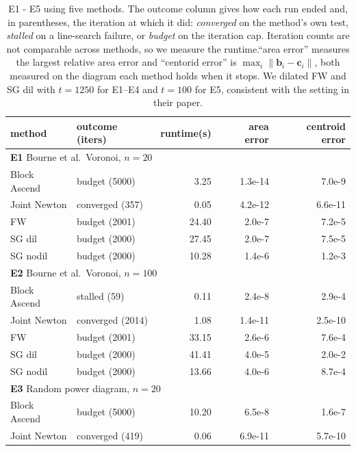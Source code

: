 \begin{table}[h]
\centering \small
\setlength{\tabcolsep}{3pt}
\caption{E1 - E5 using five methods.
The outcome column gives how each run
  ended and, in parentheses, the iteration at which it did: \emph{converged}
  on the method's own test, \emph{stalled} on a line-search failure, or
  \emph{budget} on the iteration cap. Iteration counts are not comparable
  across methods, so we measure the runtime.``area error'' measures the largest relative area error and
  ``centorid error'' is $\max_i\|\mathbf{b}_i-\mathbf{c}_i\|$, both measured on the
  diagram each method holds when it stops. We dilated FW and SG dil with $t=1250$ for E1--E4
  and $t=100$ for E5, consistent with the setting in their paper.}
\label{tab:results}
\begin{tabular}{llrrr}
\toprule
method & outcome (iters) & runtime(s) & area error & centroid error \\
\midrule
\multicolumn{5}{l}{\textbf{E1}\; Bourne et al.\ Voronoi, $n=20$}\\[1pt]
Block Ascend & budget {\scriptsize (5000)} & 3.25 & 1.3e-14 & 7.0e-9 \\
Joint Newton & converged {\scriptsize (357)} & 0.05 & 4.2e-12 & 6.6e-11 \\
FW & budget {\scriptsize (2001)} & 24.40 & 2.0e-7 & 7.2e-5 \\
SG dil & budget {\scriptsize (2000)} & 27.45 & 2.0e-7 & 7.5e-5 \\
SG nodil & budget {\scriptsize (2000)} & 10.28 & 1.4e-6 & 1.2e-3 \\
\midrule
\multicolumn{5}{l}{\textbf{E2}\; Bourne et al.\ Voronoi, $n=100$}\\[1pt]
Block Ascend & stalled {\scriptsize (59)} & 0.11 & 2.4e-8 & 2.9e-4 \\
Joint Newton & converged {\scriptsize (2014)} & 1.08 & 1.4e-11 & 2.5e-10 \\
FW & budget {\scriptsize (2001)} & 33.15 & 2.6e-6 & 7.6e-4 \\
SG dil & budget {\scriptsize (2000)} & 41.41 & 4.0e-5 & 2.0e-2 \\
SG nodil & budget {\scriptsize (2000)} & 13.66 & 4.0e-6 & 8.7e-4 \\
\midrule
\multicolumn{5}{l}{\textbf{E3}\; Random power diagram, $n=20$}\\[1pt]
Block Ascend & budget {\scriptsize (5000)} & 10.20 & 6.5e-8 & 1.6e-7 \\
Joint Newton & converged {\scriptsize (419)} & 0.06 & 6.9e-11 & 5.7e-10 \\

\end{tabular}
\end{table}
